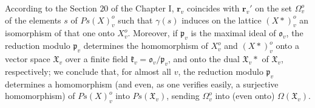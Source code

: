 \documentclass[12pt]{amsart}
\begin{document}
According to the Section $20$ of the Chapter I, $\mathbf{r}_{v}$
coincides with $\mathbf{r}_{v}'$ on the set $\Omega_{v}^{o}$ of
the elements $s$ of $Ps(X)_{v}^{o}$ such that $\gamma(s)$ induces
on the lattice $(X*)_{v}^{o}$ an isomorphism of that one onto $X_{v}^{o}$.
Moreover, if $\mathfrak{p}_{v}$ is the maximal ideal of $\mathfrak{o}_{v}$,
the reduction modulo $\mathfrak{p}_{v}$ determines the homomorphism
of $X_{v}^{o}$ and $(X*)_{v}^{o}$ onto a vector space $\mathfrak{X}_{v}$
over a finite field $\mathfrak{k}_{v}=\mathfrak{o}_{v}/\mathfrak{p}_{v}$,
and onto the dual $\mathfrak{X}_{v}*$ of $\mathfrak{X}_{v}$, respectively;
we conclude that, for almost all $v$, the reduction modulo $\mathfrak{p}_{v}$
determines a homomorphism (and even, as one verifies easily, a surjective
homomorphism) of $Ps(X)_{v}^{o}$ into $Ps(\mathfrak{X}_{v})$, sending
$\Omega_{v}^{o}$ into (even onto) $\Omega(\mathfrak{X}_{v})$.
\end{document}
